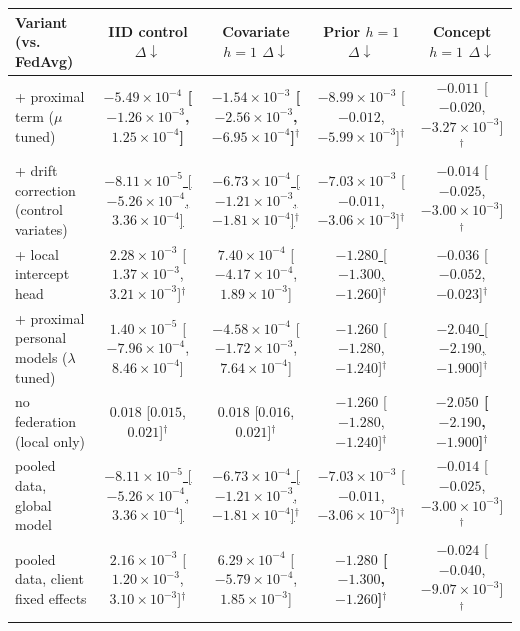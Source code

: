 \begin{tabular}{lcccc}
\toprule
Variant (vs. FedAvg) & IID control $\Delta\downarrow$ & Covariate $h=1$ $\Delta\downarrow$ & Prior $h=1$ $\Delta\downarrow$ & Concept $h=1$ $\Delta\downarrow$ \\
\midrule
+ proximal term ($\mu$ tuned) & \textbf{$-5.49\times10^{-4}$ [$-1.26\times10^{-3}$, $1.25\times10^{-4}$]} & \textbf{$-1.54\times10^{-3}$ [$-2.56\times10^{-3}$, $-6.95\times10^{-4}$]$^{\dagger}$} & $-8.99\times10^{-3}$ [$-0.012$, $-5.99\times10^{-3}$]$^{\dagger}$ & $-0.011$ [$-0.020$, $-3.27\times10^{-3}$]$^{\dagger}$ \\
+ drift correction (control variates) & \underline{$-8.11\times10^{-5}$ [$-5.26\times10^{-4}$, $3.36\times10^{-4}$]} & \underline{$-6.73\times10^{-4}$ [$-1.21\times10^{-3}$, $-1.81\times10^{-4}$]$^{\dagger}$} & $-7.03\times10^{-3}$ [$-0.011$, $-3.06\times10^{-3}$]$^{\dagger}$ & $-0.014$ [$-0.025$, $-3.00\times10^{-3}$]$^{\dagger}$ \\
+ local intercept head & $2.28\times10^{-3}$ [$1.37\times10^{-3}$, $3.21\times10^{-3}$]$^{\dagger}$ & $7.40\times10^{-4}$ [$-4.17\times10^{-4}$, $1.89\times10^{-3}$] & \underline{$-1.280$ [$-1.300$, $-1.260$]$^{\dagger}$} & $-0.036$ [$-0.052$, $-0.023$]$^{\dagger}$ \\
+ proximal personal models ($\lambda$ tuned) & $1.40\times10^{-5}$ [$-7.96\times10^{-4}$, $8.46\times10^{-4}$] & $-4.58\times10^{-4}$ [$-1.72\times10^{-3}$, $7.64\times10^{-4}$] & $-1.260$ [$-1.280$, $-1.240$]$^{\dagger}$ & \underline{$-2.040$ [$-2.190$, $-1.900$]$^{\dagger}$} \\
no federation (local only) & $0.018$ [$0.015$, $0.021$]$^{\dagger}$ & $0.018$ [$0.016$, $0.021$]$^{\dagger}$ & $-1.260$ [$-1.280$, $-1.240$]$^{\dagger}$ & \textbf{$-2.050$ [$-2.190$, $-1.900$]$^{\dagger}$} \\
pooled data, global model & \underline{$-8.11\times10^{-5}$ [$-5.26\times10^{-4}$, $3.36\times10^{-4}$]} & \underline{$-6.73\times10^{-4}$ [$-1.21\times10^{-3}$, $-1.81\times10^{-4}$]$^{\dagger}$} & $-7.03\times10^{-3}$ [$-0.011$, $-3.06\times10^{-3}$]$^{\dagger}$ & $-0.014$ [$-0.025$, $-3.00\times10^{-3}$]$^{\dagger}$ \\
pooled data, client fixed effects & $2.16\times10^{-3}$ [$1.20\times10^{-3}$, $3.10\times10^{-3}$]$^{\dagger}$ & $6.29\times10^{-4}$ [$-5.79\times10^{-4}$, $1.85\times10^{-3}$] & \textbf{$-1.280$ [$-1.300$, $-1.260$]$^{\dagger}$} & $-0.024$ [$-0.040$, $-9.07\times10^{-3}$]$^{\dagger}$ \\
\bottomrule
\end{tabular}
